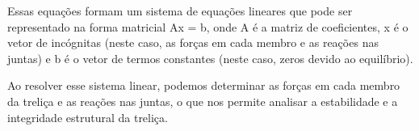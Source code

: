 Essas equações formam um sistema de equações lineares que pode ser representado na forma matricial Ax = b, onde A é a matriz de coeficientes, x é o vetor de incógnitas (neste caso, as forças em cada membro e as reações nas juntas) e b é o vetor de termos constantes (neste caso, zeros devido ao equilíbrio).

	Ao resolver esse sistema linear, podemos determinar as forças em cada membro da treliça e as reações nas juntas, o que nos permite analisar a estabilidade e a integridade estrutural da treliça.






 
